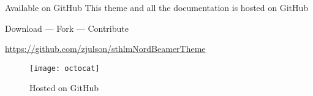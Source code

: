 \documentclass[\string~/GitHub/sthlmNordBeamerTheme/sthlmNordLightDemo.tex]{subfiles}
\begin{document}
\begin{frame}[c]{Available on GitHub}
  This theme and all the documentation is hosted on GitHub \\
  \vspace{1em}
  \begin{center}
	\large{Download --- Fork --- Contribute}

	\url{https://github.com/zjulson/sthlmNordBeamerTheme}
	\vspace{1em}

	\begin{figure}
	  \centerline{\texttt{[image: octocat]}}
	  \caption{Hosted on GitHub}
	\end{figure}

  \end{center}
\end{frame}
\end{document}

